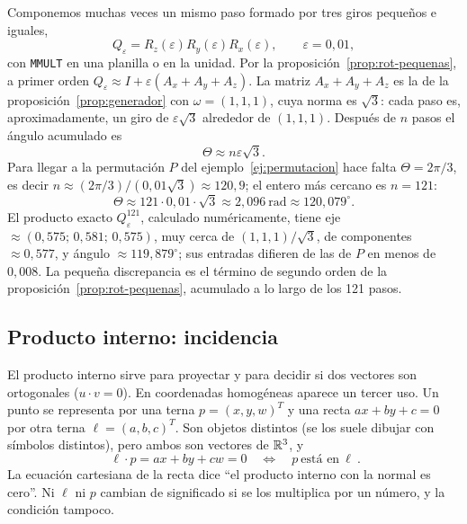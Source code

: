 Componemos muchas veces un mismo paso formado por tres giros pequeños e iguales,
\[
Q_\varepsilon
=R_z(\varepsilon)R_y(\varepsilon)R_x(\varepsilon),
\qquad \varepsilon=0{,}01,
\]
con \texttt{MMULT} en una planilla o en la unidad. Por la
proposición~\ref{prop:rot-pequenas}, a primer orden
\(Q_\varepsilon\approx I+\varepsilon(A_x+A_y+A_z)\). La matriz \(A_x+A_y+A_z\) es la de la
proposición~\ref{prop:generador} con \(\omega=(1,1,1)\), cuya norma es \(\sqrt3\): cada paso
es, aproximadamente, un giro de \(\varepsilon\sqrt3\) alrededor de \((1,1,1)\). Después de
\(n\) pasos el ángulo acumulado es
\[
  \Theta\approx n\varepsilon\sqrt3.
\]
Para llegar a la permutación \(P\) del ejemplo~\ref{ej:permutacion} hace falta
\(\Theta=2\pi/3\), es decir \(n\approx(2\pi/3)/(0{,}01\sqrt3)\approx120{,}9\); el entero más
cercano es \(n=121\):
\[
  \Theta\approx121\cdot0{,}01\cdot\sqrt3
  \approx2{,}096\ \text{rad}
  \approx120{,}079^\circ.
\]
El producto exacto \(Q_\varepsilon^{121}\), calculado numéricamente, tiene eje
\(\approx(0{,}575;\,0{,}581;\,0{,}575)\), muy cerca de \((1,1,1)/\sqrt3\),
de componentes \(\approx0{,}577\), y ángulo \(\approx119{,}879^\circ\); sus entradas difieren de las de \(P\) en
menos de \(0{,}008\). La pequeña discrepancia es el término de segundo orden de la
proposición~\ref{prop:rot-pequenas}, acumulado a lo largo de los 121 pasos.

\subsection{Producto interno: incidencia}\label{sec:interno}


El producto interno sirve para proyectar y para decidir si dos vectores son ortogonales
(\(u\cdot v=0\)). En coordenadas homogéneas aparece un tercer uso.
Un punto se representa por una terna \(p=(x,y,w)^T\) y una recta \(ax+by+c=0\) por otra
terna \(\ell=(a,b,c)^T\). Son objetos distintos (se los suele dibujar con símbolos
distintos), pero ambos son vectores de \(\mathbb{R}^3\), y
\[
  \boxed{\ \ell\cdot p=ax+by+cw=0\quad\Longleftrightarrow\quad p\ \text{está en}\ \ell\ }.
\]
La ecuación cartesiana de la recta dice \enquote{el producto interno con la normal es
cero}. Ni \(\ell\) ni \(p\) cambian de significado si se los multiplica por un número, y la
condición tampoco.


